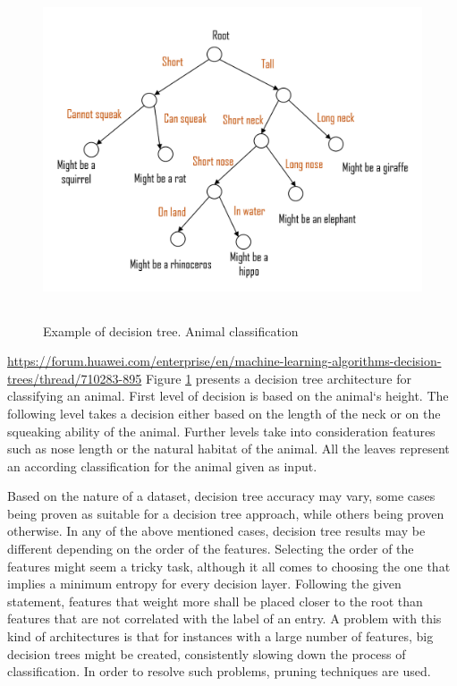 \documentclass[12pt,a4paper]{report}
\begin{document}
\begin{figure}[H]
\centering
\includegraphics[height=10cm]{pics/decisionTree.png}
  \caption[Example of decision tree. Animal classification]{Example of decision tree. Animal classification\footnotemark}
  \label{fig:DecisionTree}
\end{figure}
\urldef{\urlDecisionTree}\url{https://forum.huawei.com/enterprise/en/machine-learning-algorithms-decision-trees/thread/710283-895}
\footnotetext{\urlDecisionTree}
Figure \ref{fig:DecisionTree} presents a decision tree architecture for classifying an animal.
First level of decision is based on the animal`s height. The following level takes a decision either based on the length of the neck or on the squeaking ability of the animal. Further levels take into consideration features such as nose length or the natural habitat of the animal. All the leaves represent an according classification for the animal given as input.

Based on the nature of a dataset, decision tree accuracy may vary, some cases being proven as suitable for a decision tree approach, while others being proven otherwise. In any of the above mentioned cases, decision tree results may be different depending on the order of the features.
Selecting the order of the features might seem a tricky task, although it all comes to choosing the one that implies a minimum entropy for every decision layer. Following the given statement, features that weight more shall be placed closer to the root than features that are not correlated with the label of an entry. A problem with this kind of architectures is that for instances with a large number of features, big decision trees might be created, consistently slowing down the process of classification. In order to resolve such problems, pruning techniques are used.
\end{document}
